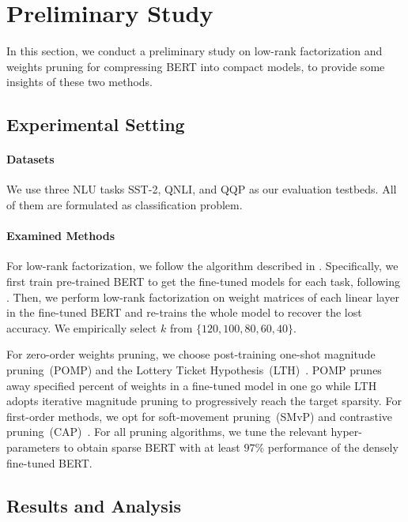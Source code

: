 \section{Preliminary Study}
\label{sec:pilot}
In this section, we conduct a preliminary study on low-rank factorization and weights pruning 
for compressing BERT into compact models, to provide some insights of these two methods.

\subsection{Experimental Setting}
\indent
\paragraph{Datasets}We use three NLU tasks SST-2, QNLI, and QQP as our evaluation testbeds. All of them are formulated as classification problem.

\paragraph{Examined Methods} For low-rank factorization, we follow the algorithm described in . Specifically, we first train pre-trained BERT to get the fine-tuned models for each task, following \citet{bert}. Then, we perform low-rank factorization on weight matrices of each linear layer in the fine-tuned BERT and re-trains the whole model to recover the lost accuracy. We empirically select $k$ from $\{120, 100, 80, 60, 40\}$.

For zero-order weights pruning, we choose post-training one-shot magnitude pruning~(POMP) and the Lottery Ticket Hypothesis~(LTH)~\cite{chen2020lottery}. POMP prunes away specified percent of weights in a fine-tuned model in one go while LTH adopts iterative magnitude pruning to progressively reach the target sparsity. For first-order methods, we opt for soft-movement pruning~(SMvP) and contrastive pruning~(CAP)~\cite{cap}. For all pruning algorithms, we tune the relevant hyper-parameters to obtain sparse BERT with at least $97\%$ performance of the densely fine-tuned BERT.

\subsection{Results and Analysis}

